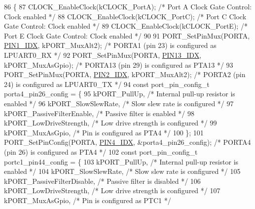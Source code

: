 \begin{DoxyCode}
86                           \{
87   CLOCK\_EnableClock(kCLOCK\_PortA);                           \textcolor{comment}{/* Port A Clock Gate Control: Clock enabled */}
88   CLOCK\_EnableClock(kCLOCK\_PortC);                           \textcolor{comment}{/* Port C Clock Gate Control: Clock enabled */}
89   CLOCK\_EnableClock(kCLOCK\_PortE);                           \textcolor{comment}{/* Port E Clock Gate Control: Clock enabled */}
90 
91   PORT\_SetPinMux(PORTA, \hyperlink{pin__mux_8c_af36e8fbe0cdf23dbe5fe82d0a1abe929}{PIN1\_IDX}, kPORT\_MuxAlt2);            \textcolor{comment}{/* PORTA1 (pin 23) is configured as
       LPUART0\_RX */}
92   PORT\_SetPinMux(PORTA, \hyperlink{pin__mux_8c_aa53d7055dbc0d10a271855831f6f89cf}{PIN13\_IDX}, kPORT\_MuxAsGpio);         \textcolor{comment}{/* PORTA13 (pin 29) is configured as
       PTA13 */}
93   PORT\_SetPinMux(PORTA, \hyperlink{pin__mux_8c_a34077169afb876e5a2afa8b23e671cec}{PIN2\_IDX}, kPORT\_MuxAlt2);            \textcolor{comment}{/* PORTA2 (pin 24) is configured as
       LPUART0\_TX */}
94   \textcolor{keyword}{const} port\_pin\_config\_t porta4\_pin26\_config = \{
95     kPORT\_PullUp,                                            \textcolor{comment}{/* Internal pull-up resistor is enabled */}
96     kPORT\_SlowSlewRate,                                      \textcolor{comment}{/* Slow slew rate is configured */}
97     kPORT\_PassiveFilterEnable,                               \textcolor{comment}{/* Passive filter is enabled */}
98     kPORT\_LowDriveStrength,                                  \textcolor{comment}{/* Low drive strength is configured */}
99     kPORT\_MuxAsGpio,                                         \textcolor{comment}{/* Pin is configured as PTA4 */}
100   \};
101   PORT\_SetPinConfig(PORTA, \hyperlink{pin__mux_8c_a1ada504d2c7f594db50cfd1d222e6339}{PIN4\_IDX}, &porta4\_pin26\_config);  \textcolor{comment}{/* PORTA4 (pin 26) is configured as
       PTA4 */}
102   \textcolor{keyword}{const} port\_pin\_config\_t portc1\_pin44\_config = \{
103     kPORT\_PullUp,                                            \textcolor{comment}{/* Internal pull-up resistor is enabled */}
104     kPORT\_SlowSlewRate,                                      \textcolor{comment}{/* Slow slew rate is configured */}
105     kPORT\_PassiveFilterDisable,                              \textcolor{comment}{/* Passive filter is disabled */}
106     kPORT\_LowDriveStrength,                                  \textcolor{comment}{/* Low drive strength is configured */}
107     kPORT\_MuxAsGpio,                                         \textcolor{comment}{/* Pin is configured as PTC1 */}

\end{DoxyCode}
